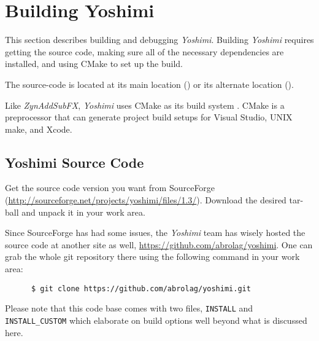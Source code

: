 %
%
%

\section{Building Yoshimi}
\label{sec:yoshimi_build}

   This section describes building and debugging \textsl{Yoshimi}.
   Building \textsl{Yoshimi} requires getting the source code, making sure
   all of the necessary dependencies are installed, and using CMake to set
   up the build.

   The source-code is located at its main location (\cite{yoshimi})
   or its alternate location (\cite{yoshimi2}).

   Like \textsl{ZynAddSubFX}, \textsl{Yoshimi} uses CMake as its build
   system \cite{zyncmake}.  CMake is a preprocessor that can generate
   project build setups for Visual Studio, UNIX make, and Xcode.

\subsection{Yoshimi Source Code}
\label{subsec:yoshimi_source_code}

   Get the source code version you want from SourceForge
   (\url{http://sourceforge.net/projects/yoshimi/files/1.3/}).
   Download the desired tar-ball and unpack it in your work area.

   Since SourceForge has had some issues, the \textsl{Yoshimi} team
   has wisely hosted the source code at another site as well,
   \url{https://github.com/abrolag/yoshimi}.  One can grab the whole
   git repository there using the following command in your work area:

   \begin{verbatim}
      $ git clone https://github.com/abrolag/yoshimi.git
   \end{verbatim}

   Please note that this code base comes with two files,
   \texttt{INSTALL} and \texttt{INSTALL\_CUSTOM} which elaborate on
   build options well beyond what is discussed here.

